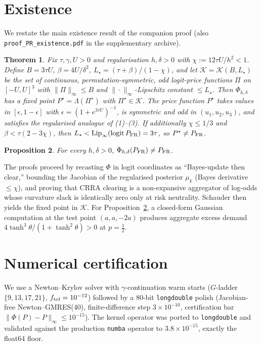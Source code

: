 \documentclass[11pt]{article}
\newtheorem{theorem}{Theorem}
\newtheorem{proposition}[theorem]{Proposition}
\newcommand{\1}{\mathbf{1}}
\begin{document}
\section{Existence}

We restate the main existence result of the companion proof
(also \texttt{proof\_PR\_existence.pdf} in the supplementary archive).

\begin{theorem}\label{thm:existence}
Fix $\tau,\gamma,U>0$ and regularisation $h,\delta>0$ with
$\chi:=12\tau U/h^2 < 1$. Define
$B = 3\tau U$, $\beta=4U/\delta^2$, $L_\star=(\tau+\beta)/(1-\chi)$, and
let $\mathcal K=\mathcal K(B,L_\star)$ be the set of continuous,
permutation-symmetric, odd logit-price functions $\Pi$ on $[-U,U]^3$ with
$\|\Pi\|_\infty\le B$ and $\|\cdot\|_\infty$-Lipschitz constant
$\le L_\star$. Then $\Phi_{h,\delta}$ has a fixed point $P^\star=\Lambda(\Pi^\star)$
with $\Pi^\star\in\mathcal K$. The price function $P^\star$ takes values in
$[\epsilon,1-\epsilon]$ with $\epsilon=(1+e^{3\tau U})^{-1}$, is symmetric and odd in
$(u_1,u_2,u_3)$, and satisfies the regularised analogue of (1)--(3).
If additionally $\chi\le 1/3$ and $\beta<\tau(2-3\chi)$, then
$L_\star < \mathrm{Lip}_\infty(\mathrm{logit}\,P_{\rm FR})=3\tau$, so
$P^\star \ne P_{\rm FR}$.
\end{theorem}

\begin{proposition}\label{prop:GS}
For every $h,\delta>0$, $\Phi_{h,\delta}(P_{\rm FR})\ne P_{\rm FR}$.
\end{proposition}

The proofs proceed by recasting $\Phi$ in logit coordinates as
``Bayes-update then clear,'' bounding the Jacobian of the regularised
posterior $\mu_k$ (Bayes derivative $\le \chi$), and proving that CRRA
clearing is a non-expansive aggregator of log-odds whose curvature
slack is identically zero only at risk neutrality. Schauder then yields
the fixed point in $\mathcal K$. For Proposition~\ref{prop:GS}, a closed-form
Gaussian computation at the test point $(a,a,-2a)$ produces aggregate
excess demand $4\tanh^3\theta/(1+\tanh^2\theta) > 0$ at $p=\tfrac12$.

\section{Numerical certification}\label{sec:numerics}

We use a Newton--Krylov solver with $\gamma$-continuation warm starts
($G$-ladder $\{9,13,17,21\}$, $f_{\rm tol}=10^{-12}$) followed by a
80-bit \texttt{longdouble} polish (Jacobian-free Newton--GMRES(40),
finite-difference step $3\times 10^{-10}$, certification bar
$\|\Phi(P)-P\|_\infty \le 10^{-15}$). The kernel operator was
ported to \texttt{longdouble} and validated against the production
\texttt{numba} operator to $3.8\times 10^{-15}$, exactly the float64
floor.
\end{document}
